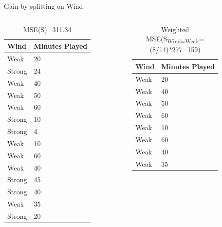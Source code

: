 \documentclass[usenames,dvipsnames]{beamer}
\begin{document}
\begin{frame}{Gain by splitting on Wind}
\begin{columns}
\begin{column}{.5\textwidth}
\begin{scriptsize}
\begin{table}[]
	\begin{tabular}{@{}ll@{}}
		\toprule
		\textbf{Wind} & \textbf{Minutes Played} \\ \midrule
		Weak          & 20                      \\
		Strong        & 24                      \\
		Weak          & 40                      \\
		Weak          & 50                      \\
		Weak          & 60                      \\
		Strong        & 10                      \\
		Strong        & 4                       \\
		Weak          & 10                      \\
		Weak          & 60                      \\
		Weak          & 40                      \\
		Strong        & 45                      \\
		Strong        & 40                      \\
		Weak          & 35                      \\
		Strong        & 20                      \\ \bottomrule
	\end{tabular}
\caption{MSE(S)=311.34}
\end{table}
	\end{scriptsize}
\end{column}
\begin{column}{.5\textwidth}
	\begin{tiny}
\vspace{-5pt}		
\begin{table}[]
	\begin{tabular}{@{}ll@{}}
		\toprule
		\textbf{Wind} & \textbf{Minutes Played} \\ \midrule
		Weak          & 20                      \\
		Weak          & 40                      \\
		Weak          & 50                      \\
		Weak          & 60                      \\
		Weak          & 10                      \\
		Weak          & 60                      \\
		Weak          & 40                      \\
		Weak          & 35                      \\ \bottomrule
	\end{tabular}
\caption{Weighted MSE(S\textsubscript{Wind=Weak}=(8/14)*277=159)}
\end{table}
\vspace{-25pt}
	\end{tiny}


\end{column}
\end{columns}
\end{frame}
\end{document}
